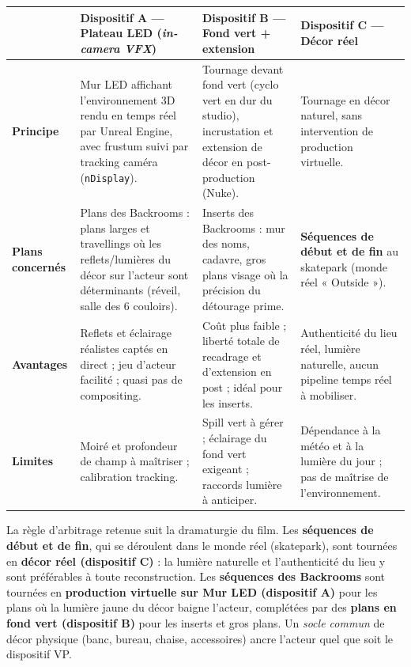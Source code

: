 \documentclass[11pt,a4paper]{report}
\begin{document}
\begin{center}
\small
\begin{tabularx}{\textwidth}{>{\bfseries}p{2.3cm} Y Y Y}
\toprule
{} & \textbf{Dispositif A --- Plateau LED (\textit{in-camera VFX})} & \textbf{Dispositif B --- Fond vert + extension} & \textbf{Dispositif C --- Décor réel} \\
\midrule
Principe & Mur LED affichant l'environnement 3D rendu en temps réel par Unreal Engine, avec frustum suivi par tracking caméra (\texttt{nDisplay}). & Tournage devant fond vert (cyclo vert en dur du studio), incrustation et extension de décor en post-production (Nuke). & Tournage en décor naturel, sans intervention de production virtuelle. \\
Plans concernés & Plans des Backrooms : plans larges et travellings où les reflets/lumières du décor sur l'acteur sont déterminants (réveil, salle des 6 couloirs). & Inserts des Backrooms : mur des noms, cadavre, gros plans visage où la précision du détourage prime. & \textbf{Séquences de début et de fin} au skatepark (monde réel « Outside »). \\
Avantages & Reflets et éclairage réalistes captés en direct ; jeu d'acteur facilité ; quasi pas de compositing. & Coût plus faible ; liberté totale de recadrage et d'extension en post ; idéal pour les inserts. & Authenticité du lieu réel, lumière naturelle, aucun pipeline temps réel à mobiliser. \\
Limites & Moiré et profondeur de champ à maîtriser ; calibration tracking. & Spill vert à gérer ; éclairage du fond vert exigeant ; raccords lumière à anticiper. & Dépendance à la météo et à la lumière du jour ; pas de maîtrise de l'environnement. \\
\bottomrule
\end{tabularx}
\end{center}

\begin{infobox}[title={Dispositifs retenus : décor réel (début / fin) + Mur LED \& fond vert (Backrooms)}]
La règle d'arbitrage retenue suit la dramaturgie du film. Les \textbf{séquences de début et de fin}, qui se déroulent dans le monde réel (skatepark), sont tournées en \textbf{décor réel (dispositif C)} : la lumière naturelle et l'authenticité du lieu y sont préférables à toute reconstruction. Les \textbf{séquences des Backrooms} sont tournées en \textbf{production virtuelle sur Mur LED (dispositif A)} pour les plans où la lumière jaune du décor baigne l'acteur, complétées par des \textbf{plans en fond vert (dispositif B)} pour les inserts et gros plans. Un \emph{socle commun} de décor physique (banc, bureau, chaise, accessoires) ancre l'acteur quel que soit le dispositif VP.
\end{infobox}
\end{document}
